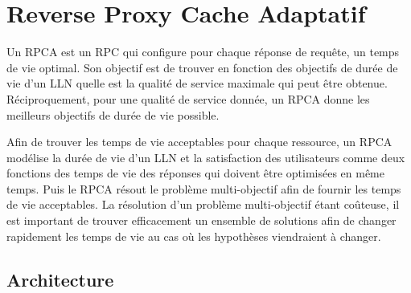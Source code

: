 \section{Reverse Proxy Cache Adaptatif}
\label{cache:rpca}

Un \ac{RPCA} est un \ac{RPC} qui configure pour chaque réponse de requête, un temps de vie optimal.
Son objectif est de trouver en fonction des objectifs de durée de vie d'un \ac{LLN} quelle est la qualité de service maximale qui peut être obtenue.
Réciproquement, pour une qualité de service donnée, un \ac{RPCA} donne les meilleurs objectifs de durée de vie possible.

Afin de trouver les temps de vie acceptables pour chaque ressource, un \ac{RPCA} modélise la durée de vie d'un \ac{LLN} et la satisfaction des utilisateurs comme deux fonctions des temps de vie des réponses qui doivent être optimisées en même temps.
Puis le \ac{RPCA} résout le problème multi-objectif afin de fournir les temps de vie acceptables.
La résolution d'un problème multi-objectif étant coûteuse, il est important de trouver efficacement un ensemble de solutions afin de changer rapidement les temps de vie au cas où les hypothèses viendraient à changer.

\subsection{Architecture}
\label{cache:architecture}

